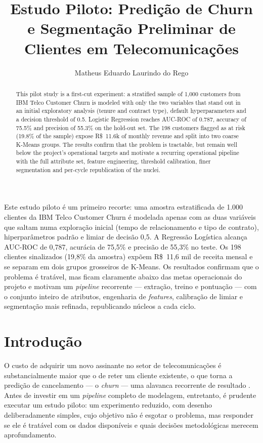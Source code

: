 \documentclass[12pt]{article}
\title{Estudo Piloto: Predição de Churn e Segmentação Preliminar de Clientes em Telecomunicações}
\author{Matheus Eduardo Laurindo do Rego\inst{1}}
\begin{document}
\maketitle

\begin{abstract}
  This pilot study is a first-cut experiment: a stratified sample of 1,000
  customers from IBM Telco Customer Churn is modeled with only the two
  variables that stand out in an initial exploratory analysis (tenure and
  contract type), default hyperparameters and a decision threshold of 0.5.
  Logistic Regression reaches AUC-ROC of 0.787, accuracy of 75.5\% and
  precision of 55.3\% on the hold-out set. The 198 customers flagged as at
  risk (19.8\% of the sample) expose R\$~11.6k of monthly revenue and split
  into two coarse K-Means groups. The results confirm that the problem is
  tractable, but remain well below the project's operational targets and
  motivate a recurring operational pipeline with the full attribute set,
  feature engineering, threshold calibration, finer segmentation and
  per-cycle republication of the nuclei.
\end{abstract}

\begin{resumo}
  Este estudo piloto é um primeiro recorte: uma amostra estratificada de
  1.000 clientes da IBM Telco Customer Churn é modelada apenas com as duas
  variáveis que saltam numa exploração inicial (tempo de relacionamento e
  tipo de contrato), hiperparâmetros padrão e limiar de decisão 0,5. A
  Regressão Logística alcança AUC-ROC de 0,787, acurácia de 75,5\% e
  precisão de 55,3\% no teste. Os 198 clientes sinalizados (19,8\% da
  amostra) expõem R\$~11,6 mil de receita mensal e se separam em dois grupos
  grosseiros de K-Means. Os resultados confirmam que o problema é tratável,
  mas ficam claramente abaixo das metas operacionais do projeto e motivam um
  \textit{pipeline} recorrente --- extração, treino e pontuação --- com o
  conjunto inteiro de atributos, engenharia de \textit{features}, calibração
  de limiar e segmentação mais refinada, republicando núcleos a cada ciclo.
\end{resumo}

\section{Introdução}
\label{sec:1}

O custo de adquirir um novo assinante no setor de telecomunicações é
substancialmente maior que o de reter um cliente existente, o que torna a
predição de cancelamento --- o \textit{churn} --- uma alavanca recorrente de
resultado \cite{hadden2007, verbeke2012}. Antes de investir em um
\textit{pipeline} completo de modelagem, entretanto, é prudente executar um
estudo piloto: um experimento reduzido, com desenho deliberadamente simples,
cujo objetivo não é esgotar o problema, mas responder se ele é tratável com os
dados disponíveis e quais decisões metodológicas merecem aprofundamento.
\end{document}
